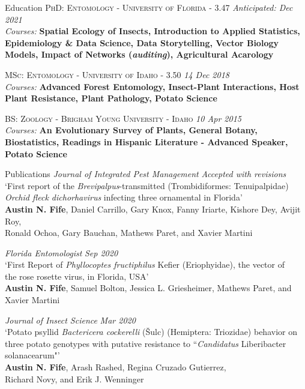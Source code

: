 \documentclass{resume} %
\begin{document}
\begin{rSection}{Education}
	\textsc{PhD: Entomology - University of Florida - 3.47} \hfill {\em Anticipated: Dec 2021}\\
	\textit{Courses:}  \textbf{Spatial Ecology of Insects, Introduction to Applied Statistics, Epidemiology \& Data Science, Data Storytelling, Vector Biology Models, Impact of Networks ({\em auditing}), Agricultural Acarology} \hfill	

	\textsc{MSc: Entomology - University of Idaho - 3.50} \hfill {\em 14 Dec 2018}\\ \textit{Courses:} \textbf{Advanced Forest Entomology, Insect-Plant Interactions, Host Plant Resistance, Plant Pathology, Potato Science} \hfill
	
	\textsc{BS: Zoology - Brigham Young University - Idaho} \hfill {\em 10 Apr 2015}\\ \textit{Courses:} \textbf{An Evolutionary Survey of Plants, General Botany, Biostatistics, Readings in Hispanic Literature - Advanced Speaker, Potato Science}\\ \hfill
\end{rSection}


\begin{rSection}{Publications}
\textit{Journal of Integrated Pest Management} \hfill {\em \textit{Accepted with revisions}}\\
`First report of the \textit{Brevipalpus}-transmitted (Trombidiformes: Tenuipalpidae)\\
\textit{Orchid fleck dichorhavirus} infecting three ornamental in Florida'\\
\textbf{Austin N. Fife}, Daniel Carrillo, Gary Knox, Fanny Iriarte, Kishore Dey, Avijit Roy,\\
 Ronald Ochoa, Gary Bauchan, Mathews Paret, and Xavier Martini \hfill
 
\textit{Florida Entomologist} \hfill {\em \textit{Sep 2020}}\\
`First Report of \textit{Phyllocoptes fructiphilus} Kefier (Eriophyidae), the vector of\\
the rose rosette virus, in Florida, USA'\\
\textbf{Austin N. Fife}, Samuel Bolton, Jessica L. Griesheimer, Mathews Paret, and Xavier Martini \hfill

\textit{Journal of Insect Science} \hfill {\em \textit{Mar 2020}}\\
`Potato psyllid \textit{Bactericera cockerelli} (Šulc) (Hemiptera: Triozidae) behavior on\\
 three potato genotypes with putative resistance to ``\textit{Candidatus} Liberibacter solanacearum"'\\
\textbf{Austin N. Fife}, Arash Rashed, Regina Cruzado Gutierrez,\\ Richard Novy, and Erik J. Wenninger

\end{rSection}
\end{document}
